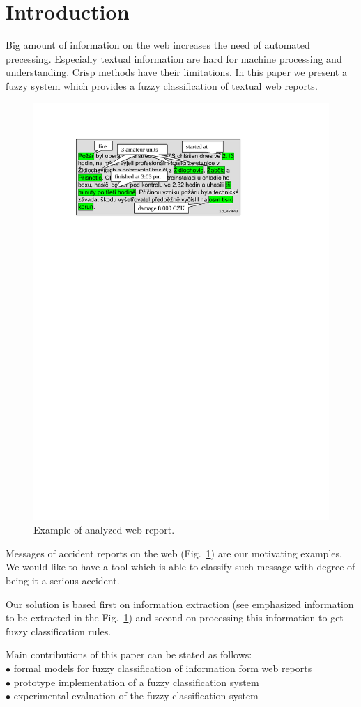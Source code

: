 \documentclass[authoryear,12pt]{elsarticle}
\begin{document}
\section{Introduction}
Big amount of information on the web increases the need of automated precessing. Especially textual information are hard for machine processing and understanding. Crisp methods have their limitations. In this paper we present a fuzzy system which provides a fuzzy classification of textual web reports. 

\begin{figure}[hbt!]
\centerline{\includegraphics[width=0.7\hsize]{img/message}}
\caption{Example of analyzed web report.}
\label{dedek:message}
\end{figure}


Messages of accident reports on the web (Fig.~\ref{dedek:message}) are our motivating examples. We would like to have a tool which is able to classify such message with degree of being it a serious accident. 

Our solution is based first on information extraction (see emphasized information to be extracted in the Fig.~\ref{dedek:message}) and second on processing this information to get fuzzy classification rules.




Main contributions of this paper can be stated as follows: 
\\$\bullet$ formal models for fuzzy classification of information form web reports
\\$\bullet$ prototype implementation of a fuzzy classification system
\\$\bullet$ experimental evaluation of the fuzzy classification system
\end{document}
